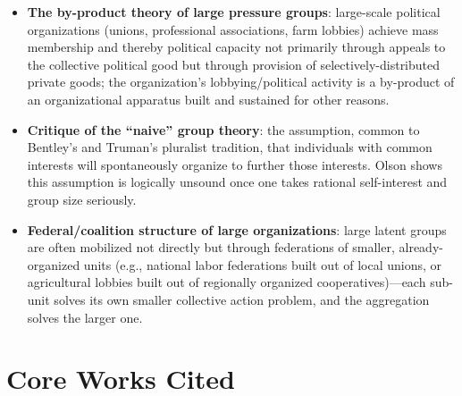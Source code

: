 \documentclass[12pt]{article}
\begin{document}
\begin{itemize}[leftmargin=*, itemsep=4pt]
    \item \textbf{The by-product theory of large pressure groups}: large-scale political organizations (unions, professional associations, farm lobbies) achieve mass membership and thereby political capacity not primarily through appeals to the collective political good but through provision of selectively-distributed private goods; the organization's lobbying/political activity is a by-product of an organizational apparatus built and sustained for other reasons.
    \item \textbf{Critique of the ``naive'' group theory}: the assumption, common to Bentley's and Truman's pluralist tradition, that individuals with common interests will spontaneously organize to further those interests. Olson shows this assumption is logically unsound once one takes rational self-interest and group size seriously.
    \item \textbf{Federal/coalition structure of large organizations}: large latent groups are often mobilized not directly but through federations of smaller, already-organized units (e.g., national labor federations built out of local unions, or agricultural lobbies built out of regionally organized cooperatives)---each sub-unit solves its own smaller collective action problem, and the aggregation solves the larger one.
\end{itemize}

\section{Core Works Cited}
\end{document}
